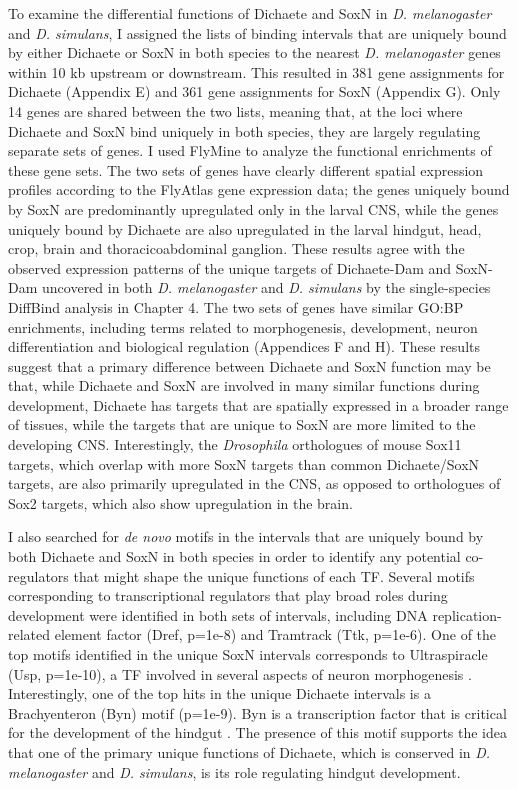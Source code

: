 To examine the differential functions of Dichaete and SoxN in \emph{D. melanogaster} and \emph{D. simulans}, I assigned the lists of binding intervals that are uniquely bound by either Dichaete or SoxN in both species to the nearest \emph{D. melanogaster} genes within 10 kb upstream or downstream. This resulted in 381 gene assignments for Dichaete (Appendix E) and 361 gene assignments for SoxN (Appendix G). Only 14 genes are shared between the two lists, meaning that, at the loci where Dichaete and SoxN bind uniquely in both species, they are largely regulating separate sets of genes. I used FlyMine to analyze the functional enrichments of these gene sets. The two sets of genes have clearly different spatial expression profiles according to the FlyAtlas gene expression data; the genes uniquely bound by SoxN are predominantly upregulated only in the larval CNS, while the genes uniquely bound by Dichaete are also upregulated in the larval hindgut, head, crop, brain and thoracicoabdominal ganglion. These results agree with the observed expression patterns of the unique targets of Dichaete-Dam and SoxN-Dam uncovered in both \emph{D. melanogaster} and \emph{D. simulans} by the single-species DiffBind analysis in Chapter 4. The two sets of genes have similar GO:BP enrichments, including terms related to morphogenesis, development, neuron differentiation and biological regulation (Appendices F and H). These results suggest that a primary difference between Dichaete and SoxN function may be that, while Dichaete and SoxN are involved in many similar functions during development, Dichaete has targets that are spatially expressed in a broader range of tissues, while the targets that are unique to SoxN are more limited to the developing CNS. Interestingly, the \emph{Drosophila} orthologues of mouse Sox11 targets, which overlap with more SoxN targets than common Dichaete/SoxN targets, are also primarily upregulated in the CNS, as opposed to orthologues of Sox2 targets, which also show upregulation in the brain.

I also searched for \emph{de novo} motifs in the intervals that are uniquely bound by both Dichaete and SoxN in both species in order to identify any potential co-regulators that might shape the unique functions of each TF. Several motifs corresponding to transcriptional regulators that play broad roles during development were identified in both sets of intervals, including DNA replication-related element factor (Dref, p=1e-8) and Tramtrack (Ttk, p=1e-6). One of the top motifs identified in the unique SoxN intervals corresponds to Ultraspiracle (Usp, p=1e-10), a TF involved in several aspects of neuron morphogenesis \citep{lee_cell-autonomous_????,parrish_genome-wide_2006}. Interestingly, one of the top hits in the unique Dichaete intervals is a Brachyenteron (Byn) motif (p=1e-9). Byn is a transcription factor that is critical for the development of the hindgut \citep{kispert_homologs_1994,murakami_developmental_1999}. The presence of this motif supports the idea that one of the primary unique functions of Dichaete, which is conserved in \emph{D. melanogaster} and \emph{D. simulans}, is its role regulating hindgut development.

